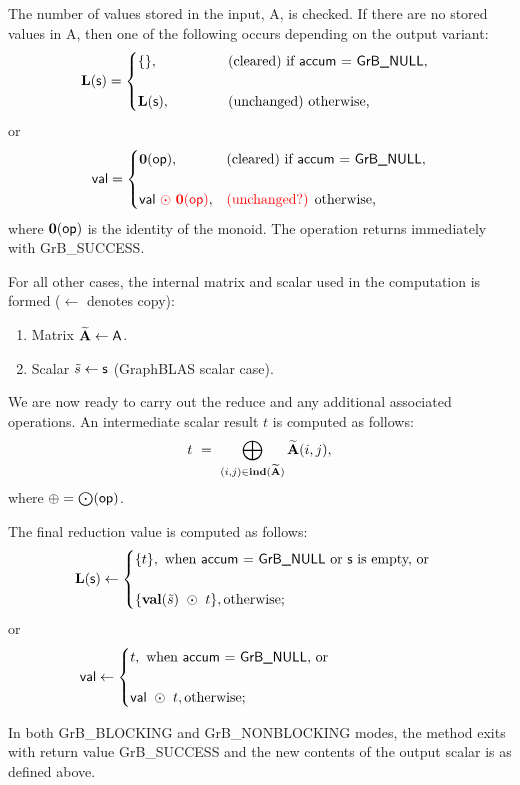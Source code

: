 The number of values stored in the input, {\sf A}, is checked.  If there are no stored values in {\sf A}, then one of the following occurs depending on the output variant:
\[ 
{\sf {\bf L}(s)} =
\begin{cases}
    \{\}, & \mbox{(cleared) if {\sf accum} = {\sf GrB\_NULL}}, ~~\\ & \\
    {\sf {\bf L}(s)}, ~~~ ~~~~~~~ & \mbox{(unchanged) otherwise,}
\end{cases}
\]
or
\[ 
{\sf val} =
\begin{cases}
    \bold{0}({\sf op}), & \mbox{(cleared) if {\sf accum} = {\sf GrB\_NULL}}, \\ & \\
    {\sf val}{\color{red} ~\odot~ {\bf 0}({\sf op})}, & \mbox{{\color{red}(unchanged?)} otherwise,}
\end{cases}
\]
where $\bold{0}({\sf op})$ is the identity of the monoid. The operation returns immediately with {\sf GrB\_SUCCESS}.

For all other cases, the internal matrix and scalar used in 
the computation is formed ($\leftarrow$ denotes copy):
\begin{enumerate}
	\item Matrix ${\bf \widetilde{A}} \leftarrow {\sf A}$.
    \item Scalar ${\tilde{s}} \leftarrow {\sf s}$ (GraphBLAS scalar case).
\end{enumerate}

We are now ready to carry out the reduce and any additional associated operations.  
An intermediate scalar result $t$ is computed as follows:
\[ 
t ~ = ~
    \bigoplus\limits_{(i, j) \in \bold{ind}({\bf \widetilde{A}})} {\bf \widetilde{A}}(i, j),
\]
where $\oplus = \bigodot({\sf op})$.

The final reduction value is computed as follows:
\[
{\sf {\bf L}(s)} \leftarrow
    \begin{cases}
    \{ t \}, \text{ when {\sf accum = GrB\_NULL} or {\sf s} is empty, or} \\ & \\
    \{ {\bf val}(\tilde{s}) ~\odot ~ t \}, \text{otherwise;} \\
    \end{cases}
\]
or 
\[
{\sf val} \leftarrow
    \begin{cases}
    t, \text{ when {\sf accum = GrB\_NULL}, or} \hspace*{0.95in} \\ & \\
    {\sf val} ~\odot ~t, \text{otherwise;} \\
    \end{cases}
\]

In both {\sf GrB\_BLOCKING} and {\sf GrB\_NONBLOCKING} modes, the method exits with return value 
{\sf GrB\_SUCCESS} and the new contents of the output scalar is as defined above.

